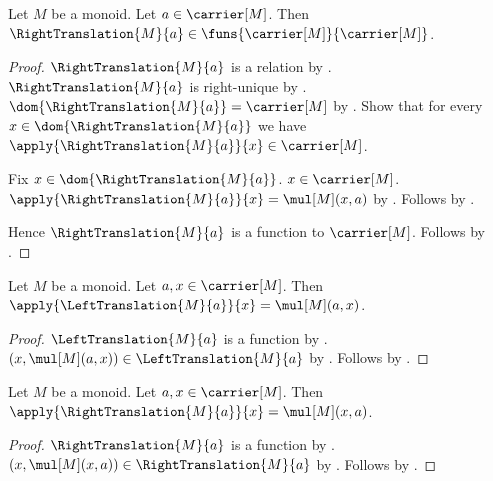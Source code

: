 \begin{proposition}\label{right_translation_monoid_function}
    Let $M$ be a monoid.
    Let $a\in\carrier[M]$.
    Then $\RightTranslation{M}{a}\in
        \funs{\carrier[M]}{\carrier[M]}$.
\end{proposition}
\begin{proof}
    $\RightTranslation{M}{a}$ is a relation
        by .
    $\RightTranslation{M}{a}$ is right-unique
        by .
    $\dom{\RightTranslation{M}{a}}=\carrier[M]$
        by .
    Show that for every $x\in\dom{\RightTranslation{M}{a}}$ we have
        $\apply{\RightTranslation{M}{a}}{x}\in\carrier[M]$.
    \begin{subproof}
        Fix $x\in\dom{\RightTranslation{M}{a}}$.
        $x\in\carrier[M]$.
        $\apply{\RightTranslation{M}{a}}{x}=\mul[M](x,a)$
            by .
        Follows by .
    \end{subproof}
    Hence $\RightTranslation{M}{a}$ is a function to $\carrier[M]$.
    Follows by .
\end{proof}

\begin{proposition}\label{left_translation_monoid_apply}
    Let $M$ be a monoid.
    Let $a,x\in\carrier[M]$.
    Then $\apply{\LeftTranslation{M}{a}}{x}=\mul[M](a,x)$.
\end{proposition}
\begin{proof}
    $\LeftTranslation{M}{a}$ is a function by
        .
    $(x,\mul[M](a,x))\in\LeftTranslation{M}{a}$ by
        .
    Follows by .
\end{proof}

\begin{proposition}\label{right_translation_monoid_apply}
    Let $M$ be a monoid.
    Let $a,x\in\carrier[M]$.
    Then $\apply{\RightTranslation{M}{a}}{x}=\mul[M](x,a)$.
\end{proposition}
\begin{proof}
    $\RightTranslation{M}{a}$ is a function by
        .
    $(x,\mul[M](x,a))\in\RightTranslation{M}{a}$ by
        .
    Follows by .
\end{proof}


